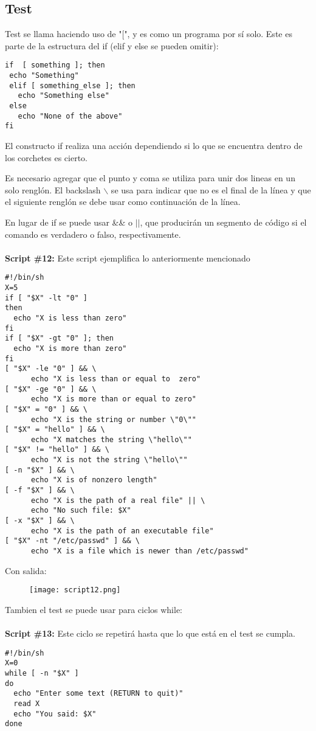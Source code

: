 \documentclass[a4paper]{article}
\begin{document}
\subsection{Test}
Test se llama haciendo uso de "[", y es como un programa por sí solo. Este es parte de la estructura del if (elif y else se pueden omitir):
\begin{verbatim}
if  [ something ]; then
 echo "Something"
 elif [ something_else ]; then
   echo "Something else"
 else
   echo "None of the above"
fi
\end{verbatim}

El constructo if realiza una acción dependiendo si lo que se encuentra dentro de los corchetes es cierto. 

Es necesario agregar que el punto y coma se utiliza para unir dos lineas en un solo renglón. El backslash $\backslash$ se usa para indicar que no es el final de la línea y que el siguiente renglón se debe usar como continuación de la línea.

En lugar de if se puede usar \&\& o $||$, que producirán un segmento de código si el comando es verdadero o falso, respectivamente. \\
\\
\textbf{Script \#12:} Este script ejemplifica lo anteriormente mencionado
\begin{verbatim}
#!/bin/sh
X=5
if [ "$X" -lt "0" ]
then
  echo "X is less than zero"
fi
if [ "$X" -gt "0" ]; then
  echo "X is more than zero"
fi
[ "$X" -le "0" ] && \
      echo "X is less than or equal to  zero"
[ "$X" -ge "0" ] && \
      echo "X is more than or equal to zero"
[ "$X" = "0" ] && \
      echo "X is the string or number \"0\""
[ "$X" = "hello" ] && \
      echo "X matches the string \"hello\""
[ "$X" != "hello" ] && \
      echo "X is not the string \"hello\""
[ -n "$X" ] && \
      echo "X is of nonzero length"
[ -f "$X" ] && \
      echo "X is the path of a real file" || \
      echo "No such file: $X"
[ -x "$X" ] && \
      echo "X is the path of an executable file"
[ "$X" -nt "/etc/passwd" ] && \
      echo "X is a file which is newer than /etc/passwd"
\end{verbatim}

Con salida:
 \begin{figure}[h!]
  \texttt{[image: script12.png]}
  \centering
  \label{fig:25}
\end{figure}

Tambien el test se puede usar para ciclos while: \\
\\
\textbf{Script \#13:} Este ciclo se repetirá hasta que lo que está en el test se cumpla.
\begin{verbatim}
#!/bin/sh
X=0
while [ -n "$X" ]
do
  echo "Enter some text (RETURN to quit)"
  read X
  echo "You said: $X"
done
\end{verbatim}
\end{document}
